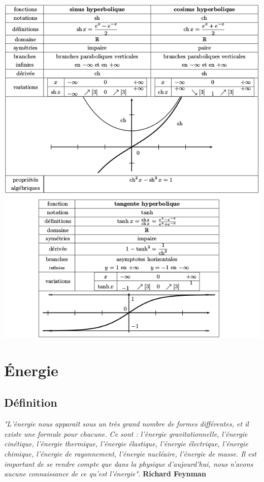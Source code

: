 \documentclass[a4paper,10pt]{book}
\begin{document}
\begin{center} \includegraphics[scale=0.55]{images/022.png} \end{center}

\chapter{Énergie}
\section{Définition}
\emph{"L’énergie nous apparaît sous un très grand nombre de formes différentes, et il existe une formule pour chacune. Ce sont : l’énergie gravitationnelle, l’énergie cinétique, l’énergie thermique, l’énergie élastique, l’énergie électrique, l’énergie chimique, l’énergie de rayonnement, l’énergie nucléaire, l’énergie de masse. Il est important de se rendre compte que dans la physique d’aujourd’hui, nous n’avons aucune connaissance de ce qu’est l’énergie".} \textbf{Richard Feynman}\\
\end{document}
